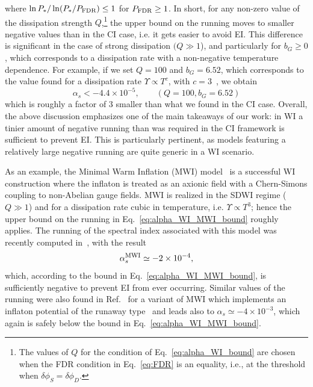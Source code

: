 \documentclass[a4paper,11pt]{article}
\begin{document}
where $\ln
P_*/\ln(P_*/P_{\rm{FDR}})\leq1$ for $P_{\rm{FDR}}\geq1$. In short, for any non-zero value of the dissipation strength $Q$,\footnote{The values of $Q$
for the condition of Eq.~\eqref{eq:alpha_WI_bound} are chosen when the
FDR condition in Eq.~\eqref{eq:FDR} is an equality, i.e., at the
threshold when $\delta\phi_S=\delta\phi_D$.} the upper bound on the running moves to smaller negative values   than in the CI case, i.e. it gets easier to avoid EI. This difference is significant in the case of strong dissipation $(Q\gg 1$), and particularly for $b_G\geq 0$, which corresponds to a dissipation rate with a non-negative temperature dependence. For example,
if we set $Q = 100$ and $b_G = 6.52$, which corresponds to the value found for a dissipation rate
$\Upsilon\propto T^c$, with $c=3$~\cite{Montefalcone:2022jfw}, we obtain
\begin{equation}
    \alpha_s< -4.4 \times 10^{-5}, \qquad \text{$(Q=100, b_G=6.52)$}\label{eq:alpha_WI_MWI_bound}
\end{equation}
which is roughly a factor of $3$ smaller than what we found in the CI
case. 
Overall, the above discussion emphasizes one of the main takeaways of our work: in WI a tinier amount of negative running than was required in the CI framework 
is sufficient to prevent EI. This is particularly pertinent, as models featuring a relatively large negative running are quite generic in a WI scenario.

As an example, the Minimal Warm Inflation (MWI) model~\cite{Berghaus:2019whh} is a successful WI construction where the
inflaton is treated as an axionic field with a Chern-Simons coupling
to non-Abelian gauge fields. MWI is realized in the SDWI regime ($Q\gg1$) and for a dissipation rate cubic in temperature, i.e. $\Upsilon\propto T^3$; hence the upper bound on the running in Eq.~\eqref{eq:alpha_WI_MWI_bound} roughly applies. The running of the
spectral index associated with this model was recently computed in~\cite{Das:2022ubr}, with the result
\begin{equation}
\alpha_s^{\rm{MWI}}\simeq -2\times 10^{-4}, \label{eq:alpha_MWI_computed}
\end{equation}
which, according to the bound in Eq.~\eqref{eq:alpha_WI_MWI_bound}, is
sufficiently negative to prevent EI from ever occurring. Similar
values of  the running were also found in Ref.~\cite{Das:2022ubr} for
a variant of MWI which implements an inflaton potential of the runaway
type~\cite{Das:2020xmh} and leads also to $\alpha_s\simeq
-4\times10^{-3}$, which again is safely below the bound in
Eq.~\eqref{eq:alpha_WI_MWI_bound}.
\end{document}
